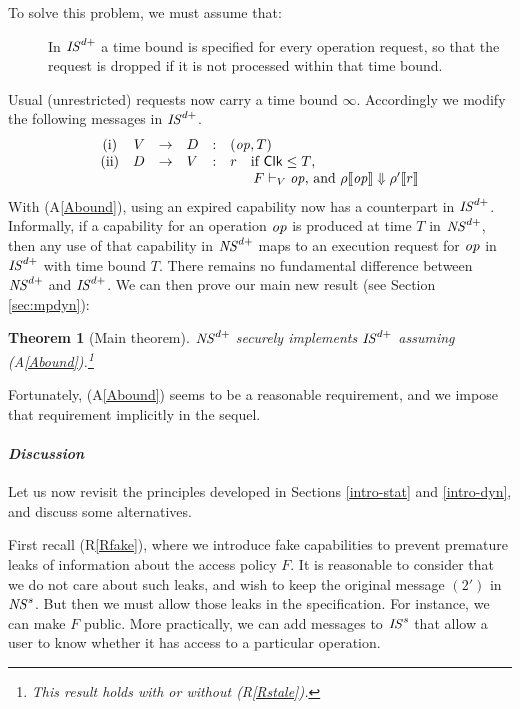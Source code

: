 \documentclass[10pt]{article}
\makeatletter
\newtheorem{theorem}{Theorem}
\newcounter{Cassums}
\newcommand{\clk}{\mathsf{Clk}}
\newcommand{\op}{{\it op}}
\newcommand{\A}{\addtocounter{Cassums}{1}A\arabic{Cassums}\gdef\@currentlabel{\arabic{Cassums}}}
\makeatother
\begin{document}
To solve this problem, we must assume that:
\begin{description}
\item[\A]\label{Abound} In ${\it IS}^{d+}$ a time bound is specified for every operation request, so that the request is dropped if it is not processed within that time bound. 
\end{description}
Usual (unrestricted) requests now carry a time bound $\infty$. Accordingly we modify the following messages in ${\it IS}^{d+}$.
\[
\left.
\begin{array}{crclcl}
({\rm i}) &  V & \rightarrow  & D & : & (\op,T) \\
({\rm ii}) &  D & \rightarrow  & V & : & r~~\mbox{ if }\clk \leq T\mbox{, }\\
&&&&&~~~~~F \vdash_V \op\mbox{, and }\rho\llbracket\op\rrbracket \Downarrow \rho'\llbracket r\rrbracket 
\end{array}
\right.
\]
With (A\ref{Abound}), using an expired capability now has a counterpart in ${\it IS}^{d+}$. Informally, if a capability for an operation $\op$ is produced at time $T$ in ${\it NS}^{d+}$, then any use of that capability in ${\it NS}^{d+}$ maps to an execution request for $\op$ in ${\it IS}^{d+}$ with time bound $T$. There remains no fundamental difference between ${\it NS}^{d+}$ and ${\it IS}^{d+}$. 
We can then prove our main new result (see Section \ref{sec:mpdyn}):
\begin{theorem}[Main theorem] ${\it NS}^{d+}$ securely implements ${\it IS}^{d+}$ assuming {\rm (A\ref{Abound})}.\footnote{This result holds with or without (R\ref{Rstale}).}
\end{theorem}
\noindent 
Fortunately, (A\ref{Abound}) seems to be a reasonable requirement, and we impose that requirement implicitly in the sequel. 

\paragraph{\em Discussion}
Let us now revisit the principles developed in Sections \ref{intro-stat} and \ref{intro-dyn}, and discuss some alternatives.

First recall (R\ref{Rfake}), where we introduce fake capabilities to prevent premature leaks of information about the access policy $F$. It is reasonable to consider that we do not care about such leaks, and wish to keep the original message  $(2')$ in ${\it NS}^s$. But then we must allow those leaks in the specification. For instance, we can make $F$ public. 
More practically, we can add messages to ${\it IS}^s$ that allow a user to know whether it has access to a particular operation.
\end{document}
